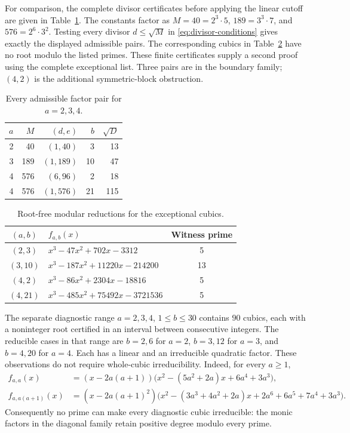 For comparison, the complete divisor certificates before applying the
linear cutoff are given in Table~\ref{tab:divisors}. The constants factor
as $M=40=2^3\cdot5$, $189=3^3\cdot7$, and
$576=2^6\cdot3^2$. Testing every divisor $d\leq\sqrt M$ in
\eqref{eq:divisor-conditions} gives exactly the displayed admissible pairs.
The corresponding cubics in Table~\ref{tab:cubics} have no root modulo
the listed primes. These finite certificates supply a second proof using
the complete exceptional list. Three pairs are in the boundary family;
$(4,2)$ is the additional symmetric-block obstruction.

\begin{table}[ht]
\centering
\begin{tabular}{rrrrr}
\toprule
$a$ & $M$ & $(d,e)$ & $b$ & $\sqrt D$\\
\midrule
2 & 40 & $(1,40)$ & 3 & 13\\
3 & 189 & $(1,189)$ & 10 & 47\\
4 & 576 & $(6,96)$ & 2 & 18\\
4 & 576 & $(1,576)$ & 21 & 115\\
\bottomrule
\end{tabular}
\caption{Every admissible factor pair for $a=2,3,4$.}
\label{tab:divisors}
\end{table}

\begin{table}[ht]
\centering
\begin{tabular}{clc}
\toprule
$(a,b)$ & $f_{a,b}(x)$ & Witness prime\\
\midrule
$(2,3)$ & $x^3-47x^2+702x-3312$ & 5\\
$(3,10)$ & $x^3-187x^2+11220x-214200$ & 13\\
$(4,2)$ & $x^3-86x^2+2304x-18816$ & 5\\
$(4,21)$ & $x^3-485x^2+75492x-3721536$ & 5\\
\bottomrule
\end{tabular}
\caption{Root-free modular reductions for the exceptional cubics.}
\label{tab:cubics}
\end{table}

The separate diagnostic range $a=2,3,4$, $1\leq b\leq30$ contains
$90$ cubics, each with a noninteger root certified in an interval between
consecutive integers. The reducible cases in that range are $b=2,6$
for $a=2$, $b=3,12$ for $a=3$, and $b=4,20$ for $a=4$.
Each has a linear and an irreducible quadratic factor.
These observations do not require whole-cubic irreducibility.
Indeed, for every $a\geq1$,
\begin{align*}
f_{a,a}(x)&=(x-2a(a+1))
 \bigl(x^2-(5a^2+2a)x+6a^4+3a^3\bigr),\\
f_{a,a(a+1)}(x)&=(x-2a(a+1)^2)
 \bigl(x^2-(3a^3+4a^2+2a)x+2a^6+6a^5+7a^4+3a^3\bigr).
\end{align*}
Consequently no prime can make every diagnostic cubic irreducible: the
monic factors in the diagonal family retain positive degree modulo every
prime.

